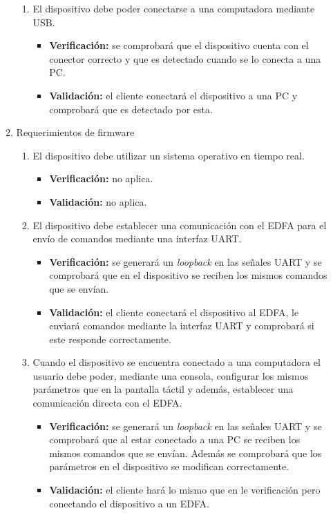 \documentclass[
11pt, %
codirector, %
]{charter}
\begin{document}
\begin{enumerate}
\begin{enumerate}
\begin{enumerate}[label*=\arabic*.]
\item El dispositivo debe poder conectarse a una computadora mediante USB.
\begin{itemize}
	\item \textbf{Verificación:} se comprobará que el dispositivo cuenta con el conector correcto y que es detectado cuando se lo conecta a una PC.
	\item \textbf{Validación:} el cliente conectará el dispositivo a una PC y comprobará que es detectado por esta.
\end{itemize}

\end{enumerate}

\item Requerimientos de firmware
\begin{enumerate}[label*=\arabic*.]
\item El dispositivo debe utilizar un sistema operativo en tiempo real.
\begin{itemize}
	\item \textbf{Verificación:} no aplica.
	\item \textbf{Validación:} no aplica.
\end{itemize}

\item El dispositivo debe establecer una comunicación con el EDFA para el envío de comandos mediante una interfaz UART.
\begin{itemize}
	\item \textbf{Verificación:} se generará un \textit{loopback} en las señales UART y se comprobará que en el dispositivo se reciben los mismos comandos que se envían.
	\item \textbf{Validación:} el cliente conectará el dispositivo al EDFA, le enviará comandos mediante la interfaz UART y comprobará si este responde correctamente.
\end{itemize}

\item Cuando el dispositivo se encuentra conectado a una computadora el usuario debe poder, mediante una consola, configurar los mismos parámetros que en la pantalla táctil y además, establecer una comunicación directa con el EDFA.
\begin{itemize}
	\item \textbf{Verificación:} se generará un \textit{loopback} en las señales UART y se comprobará que al estar conectado a una PC se reciben los mismos comandos que se envían. Además se comprobará que los parámetros en el dispositivo se modifican correctamente.
	\item \textbf{Validación:} el cliente hará lo mismo que en le verificación pero conectando el dispositivo a un EDFA.
\end{itemize}


\end{enumerate}
\end{enumerate}
\end{enumerate}
\end{document}
